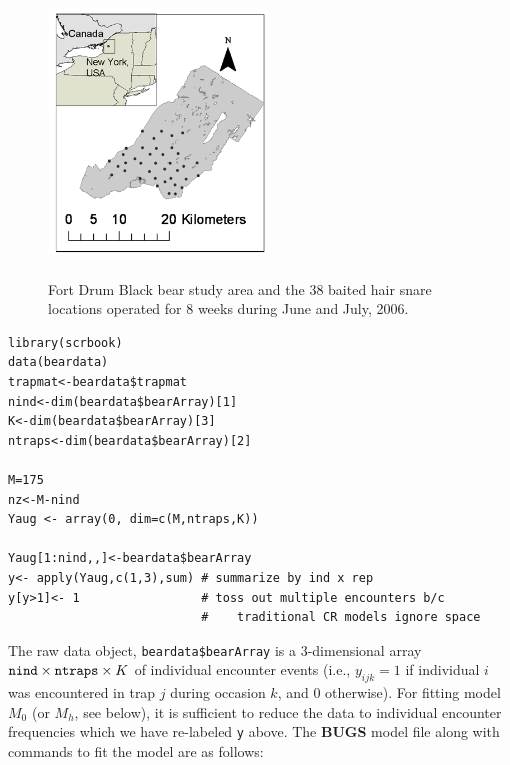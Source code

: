 \begin{figure}
\centering
\includegraphics[height=3in,width=2.28in]{Ch3-Closed/figs/hairsnares.png}
\caption{Fort Drum Black bear study area and the 38 baited hair snare
  locations operated for 8 weeks during June and July, 2006.}
\label{closed.fig.fortdrum}
\end{figure}

{\small
\begin{verbatim}
library(scrbook)
data(beardata)
trapmat<-beardata$trapmat
nind<-dim(beardata$bearArray)[1]
K<-dim(beardata$bearArray)[3]
ntraps<-dim(beardata$bearArray)[2]

M=175
nz<-M-nind
Yaug <- array(0, dim=c(M,ntraps,K))

Yaug[1:nind,,]<-beardata$bearArray
y<- apply(Yaug,c(1,3),sum) # summarize by ind x rep
y[y>1]<- 1                 # toss out multiple encounters b/c
                           #    traditional CR models ignore space
\end{verbatim}
}


The raw data object, \mbox{\tt beardata\$bearArray} is a 3-dimensional
array $\mbox{\tt nind} \times \mbox{\tt ntraps} \times K$ of
individual encounter events (i.e., $y_{ijk} = 1$ if individual $i$ was
encountered in trap $j$ during occasion $k$, and 0 otherwise).  For
fitting model $M_{0}$ (or $M_{h}$, see below), it is sufficient to
reduce the data to individual encounter frequencies which we have
re-labeled \mbox{\tt y} above.  The {\bf BUGS} model file along with
commands to fit the model are as follows:

